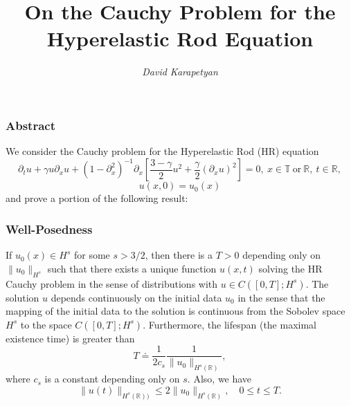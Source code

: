 \documentclass{beamer}
\date{}
\title{On the Cauchy Problem for the Hyperelastic Rod Equation}
\author{\it David Karapetyan}
\newcommand{\rr}{\mathbb{R}}
\newcommand{\p}{\partial}
\begin{document}
%
\begin{frame}
\titlepage
\end{frame}

\begin{frame}
\frametitle{Abstract}
We consider the Cauchy problem for the Hyperelastic Rod (HR) equation
\begin{equation*} 
\label{hr}
\partial_t u + \gamma u\partial_x u + (1-\p_x^2)^{-1} \p_x \left
[\frac{3- \gamma}{2} u^2 + \frac{\gamma}{2}(\p_x u)^2 \right ] = 0,
\ x \in  \mathbb{T} \  \text{or}  \ \rr,  \ t \in \mathbb{R},
\end{equation*}
\begin{equation*} 
\label{hr-data} 
u(x, 0) = u_0 (x)
\end{equation*}
%
and prove a portion of the following result:
%
%
%
%
%
\frametitle{Well-Posedness}
\end{frame}
\begin{frame}
\begin{theorem}
\label{hr-wp}
If $u_0(x) \in  H^s$ for some $s >3/2$,  then there is  a $T>0$
depending only on  $\|u_0\|_{H^s}$ such that there exists a unique
function $u(x, t)$ solving  the HR Cauchy problem
in the sense of distributions with  $u \in C([0, T]; H^s)$.
The solution $u$ depends continuously on the initial data $u_0$
in the sense that the mapping of the initial data to the solution 
is continuous from the Sobolev space $H^s$ to the space $C([0, T]; H^s)$.
Furthermore, the  lifespan (the maximal existence time)
is greater than 
%
\begin{equation*}
T
\doteq
\frac{1}{2c_s}
\frac{1}{ \|u_0 \|_{H^s(\rr)}},
\end{equation*}
%
where $c_s$  is a constant depending only on $s$.
Also, we have 
%
\begin{equation*}
\label{u-u0-Hs-bound}
\|u(t)\|_{H^s(\rr))}
\le
2
\|u_0 \|_{H^s(\rr)},
\quad
0\le t \le T.
\end{equation*}
%
\end{theorem}
\end{frame}
%
%
%
\end{document}
